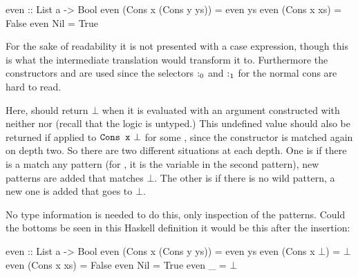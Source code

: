 \begin{code}
even :: List a -> Bool
even (Cons x (Cons y ys)) = even ys
even (Cons x xs)          = False
even Nil                  = True
\end{code}

\noindent
For the sake of readability it is not presented with a case
expression, though this is what the intermediate translation would
transform it to. Furthermore the constructors  and 
are used since the selectors $\mathrm{:_0}$ and $\mathrm{:_1}$ for the
normal cons are hard to read.

Here,  should return $\bot$ when it is evaluated with an
argument constructed with neither  nor  (recall that
the logic is untyped.) This undefined value should also be returned if
applied to $\texttt{Cons x\,\,}\bot$ for some , since the 
constructor is matched again on depth two. So there are two different
situations at each depth. One is if there is a match any pattern (for
, it is the variable  in the second pattern), new
patterns are added that matches $\bot$. The other is if there is no
wild pattern, a new one is added that goes to $\bot$.

\begin{comment}
First, it needs to be determined if there is a match-anything branch or not.
For \hs{even} above, there is no match anything case, so a new one is added
that matches anything that is not

For each matched constructor, we need to add a new match to bottom,
which evaluates to bottom. Unnecessary bottoms can be carelessly added
since overlapping patterns are removed \emph{afterwards}. Furthermore,
a wild pattern is added at the end that goes to bottom in case there
are other constructors for the data type not mentioned in the
patterns.
\end{comment}

No type information is needed to do this, only inspection of the
patterns. Could the bottoms be seen in this Haskell definition it
would be this after the insertion:

\begin{code}[mathescape]
even :: List a -> Bool
even (Cons x (Cons y ys)) = even ys
even (Cons x $\bot$)            = $\bot$
even (Cons x xs)          = False
even Nil                  = True
even _                    = $\bot$
\end{code}

